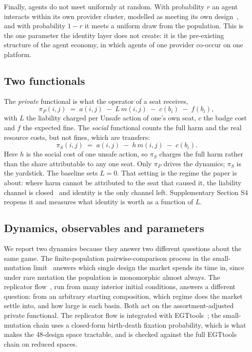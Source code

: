 \documentclass[a4paper,fleqn,longmktitle]{cas-sc}
\theoremstyle{plain}
\theoremstyle{definition}
\newcommand{\piP}{\pi_{P}}
\newcommand{\piS}{\pi_{S}}
\begin{document}
Finally, agents do not meet uniformly at random. With probability $r$ an agent
interacts within its own provider cluster, modelled as meeting its own
design~\citep{grafen1979hawk},
and with probability $1 - r$ it meets a uniform draw from the population. This
is the one parameter the identity layer does not create: it is the pre-existing
structure of the agent economy, in which agents of one provider co-occur on one
platform.

\subsection{Two functionals}
\label{sec:functionals}

The \emph{private} functional is what the operator of a seat receives,
\begin{equation}
\label{eq:private}
\piP(i, j) \;=\; a(i, j) \;-\; L\, m(i, j) \;-\; c(b_i) \;-\; f(b_i),
\end{equation}
with $L$ the liability charged per Unsafe action of one's own seat, $c$ the
badge cost and $f$ the expected fine. The \emph{social} functional counts the
full harm and the real resource costs, but not fines, which are transfers:
\begin{equation}
\label{eq:social}
\piS(i, j) \;=\; a(i, j) \;-\; h\, m(i, j) \;-\; c(b_i).
\end{equation}
Here $h$ is the social cost of one unsafe action, so $\piS$ charges the full
harm rather than the share attributable to any one seat.
Only $\piP$ drives the dynamics; $\piS$ is the yardstick. The baseline sets
$L = 0$. That setting is the regime the paper is about: where harm cannot be
attributed to the seat that caused it, the liability channel is
closed~\citep{chan2024visibility,kolt2025governing} and identity is the only
channel left. Supplementary Section S4 reopens it and measures what identity is worth
as a function of $L$.

\subsection{Dynamics, observables and parameters}
\label{sec:dynamics}

We report two dynamics because they answer two different questions about the
same game. The finite-population pairwise-comparison process in the
small-mutation limit~\citep{fudenberg2006imitation,traulsen2006stochastic}
answers which single design the market spends its time in, since under rare
mutation the population is monomorphic almost always. The replicator
flow~\citep{taylor1978ess,hofbauer1998evolutionary}, run from many interior
initial conditions, answers a different question: from an arbitrary starting
composition, which regime does the market settle into, and how large is each
basin. Both act on the assortment-adjusted private functional. The replicator
flow is integrated with EGTtools~\citep{domingos2023egttools}; the
small-mutation chain uses a closed-form birth-death fixation probability,
which is what makes the 48-design space tractable, and is checked against the
full EGTtools chain on reduced spaces.
\end{document}
